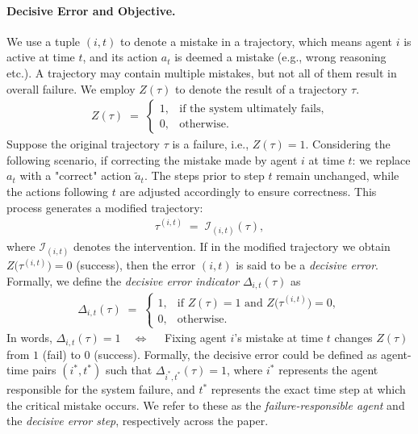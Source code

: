 \paragraph{Decisive Error and Objective.}
We use a tuple $(i,t)$ to denote a mistake in a trajectory, which means agent $i$ is active at time $t$, and its action $a_t$ is deemed a mistake (e.g., wrong reasoning etc.). 
A trajectory may contain multiple mistakes, but not all of them result in overall failure.
We employ $Z(\tau)$ to denote the result of a trajectory $\tau$. 
\begin{align}
Z(\tau)
\;=\;
\begin{cases}
1, 
& 
\text{if the system ultimately fails},\\[6pt]
0, 
& 
\text{otherwise}.
\end{cases}
\end{align}
Suppose the original trajectory $\tau$ is a failure, i.e., $Z(\tau)=1$.
Considering the following scenario, if correcting the mistake made by agent $i$ at time $t$: we replace $a_t$ with a "correct" action $\tilde{a}_t$. The steps prior to step $t$ remain unchanged, while the actions following $t$ are adjusted accordingly to ensure correctness. This process generates a modified trajectory:
\begin{align}
    \tau^{(i,t)} 
    \;=\;
    \mathcal{I}_{(i,t)}(\tau),
\end{align}
where $\mathcal{I}_{(i,t)}$ denotes the intervention.
If in the modified trajectory we obtain $Z\bigl(\tau^{(i,t)}\bigr)=0$ (success), then the error $(i,t)$ is said to be a \emph{decisive error}.
Formally, we define the \emph{decisive error indicator} $\Delta_{i,t}(\tau)$ as
\begin{align}
\Delta_{i,t}(\tau)
\;=\;
\begin{cases}
1, 
& 
\text{if } Z(\tau) = 1 \text{ and } Z\bigl(\tau^{(i,t)}\bigr) = 0,\\[6pt]
0, 
& 
\text{otherwise}.
\end{cases}
\end{align}
In words,
$
\Delta_{i,t}(\tau) = 1
\quad
\Longleftrightarrow
\quad$
Fixing agent $i$'s mistake at time $t$ changes $Z(\tau)$ from $1$ (fail) to $0$ (success). Formally, the decisive error could be defined as agent-time pairs $(i^*, t^*)$ such that $\Delta_{i^*,t^*}(\tau) = 1$, where $i^*$ represents the agent responsible for the system failure, and $t^*$ represents the exact time step at which the critical mistake occurs. We refer to these as the \emph{failure-responsible agent} and the \emph{decisive error step}, respectively across the paper.

